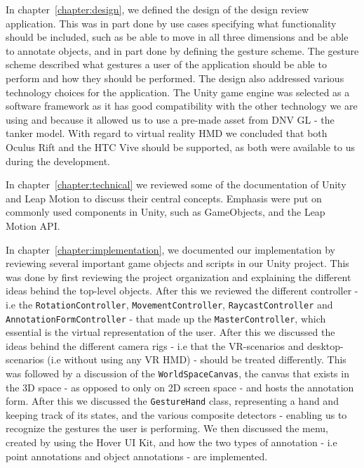 In chapter~\ref{chapter:design}, we defined the design of the design review application. This was in part done by use cases specifying what functionality should 
be included, such as be able to move in all three dimensions and be able to annotate objects, and in part done by defining the gesture scheme. The gesture scheme
described what gestures a user of the application should be able to perform and how they should be performed. The design also addressed various technology 
choices for the application. The Unity game engine was selected as a software framework as it has good compatibility with the other technology we are using and 
because it allowed us to use a pre-made asset from DNV GL - the tanker model. With regard to virtual reality HMD we concluded that both Oculus Rift and the 
HTC Vive should be supported, as both were available to us during the development.

In chapter~\ref{chapter:technical} we reviewed some of the documentation of Unity and Leap Motion to discuss their central concepts. 
Emphasis were put on commonly used components in Unity, such as GameObjects, and the Leap Motion API.

In chapter~\ref{chapter:implementation}, we documented our implementation by reviewing several important game objects and scripts in our Unity project. 
This was done by first reviewing the project organization and explaining the different ideas behind the top-level objects. 
After this we reviewed the different controller - i.e the \texttt{Rotation\-Controller}, \texttt{Movement\-Controller}, \texttt{Raycast\-Controller} and 
\texttt{Annotation\-Form\-Controller} - that made up the \texttt{MasterController}, which essential is the virtual representation of the user. 
After this we discussed the ideas behind the different camera rigs - i.e that the VR-scenarios and desktop-scenarios (i.e without using any VR HMD) - should
be treated differently. This was followed by a discussion of the \texttt{World\-Space\-Canvas}, the canvas that exists in the 3D space - as opposed to only 
on 2D screen space - and hosts the annotation form. After this we discussed the \texttt{GestureHand} class, representing a hand and keeping track of its states, 
and the various composite detectors - enabling us to recognize the gestures the user is performing. We then discussed the menu, created by using the Hover UI Kit,
and how the two types of annotation - i.e point annotations and object annotations - are implemented. 

